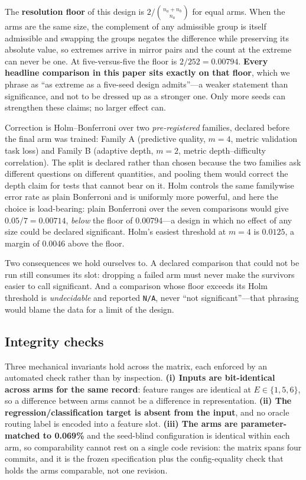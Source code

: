 The \textbf{resolution floor} of this design is $2/\binom{n_a+n_b}{n_a}$ for equal
arms. When the arms are the same size, the complement of any admissible group is
itself admissible and swapping the groups negates the difference while preserving
its absolute value, so extremes arrive in mirror pairs and the count at the extreme
can never be one. At five-versus-five the floor is $2/252 = 0.00794$. \textbf{Every
headline comparison in this paper sits exactly on that floor}, which we phrase as
``as extreme as a five-seed design admits''---a weaker statement than significance,
and not to be dressed up as a stronger one. Only more seeds can strengthen these
claims; no larger effect can.

Correction is Holm--Bonferroni over two \emph{pre-registered} families, declared
before the final arm was trained: Family A (predictive quality, $m=4$, metric
validation task loss) and Family B (adaptive depth, $m=2$, metric depth--difficulty
correlation). The split is declared rather than chosen because the two families ask
different questions on different quantities, and pooling them would correct the
depth claim for tests that cannot bear on it. Holm controls the same familywise
error rate as plain Bonferroni and is uniformly more powerful, and here the choice
is load-bearing: plain Bonferroni over the seven comparisons would give
$0.05/7 = 0.00714$, \emph{below} the floor of 0.00794---a design in which no effect
of any size could be declared significant. Holm's easiest threshold at $m=4$ is
$0.0125$, a margin of 0.0046 above the floor.

Two consequences we hold ourselves to. A declared comparison that could not be run
still consumes its slot: dropping a failed arm must never make the survivors easier
to call significant. And a comparison whose floor exceeds its Holm threshold is
\emph{undecidable} and reported \texttt{N/A}, never ``not significant''---that
phrasing would blame the data for a limit of the design.

\subsection{Integrity checks}
\label{sec:integrity}

Three mechanical invariants hold across the matrix, each enforced by an automated
check rather than by inspection. \textbf{(i) Inputs are bit-identical across arms
for the same record}: feature ranges are identical at $E \in \{1,5,6\}$, so a
difference between arms cannot be a difference in representation. \textbf{(ii) The
regression/classification target is absent from the input}, and no oracle routing
label is encoded into a feature slot. \textbf{(iii) The arms are parameter-matched
to 0.069\%} and the seed-blind configuration is identical within each arm, so
comparability cannot rest on a single code revision: the matrix spans four commits,
and it is the frozen specification plus the config-equality check that holds the
arms comparable, not one revision.

